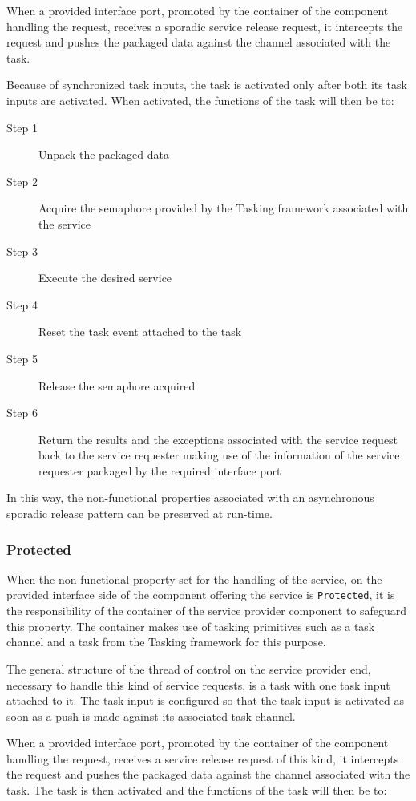 When a provided interface port, promoted by the container of the component handling the request, receives a sporadic service release request, it intercepts the request and pushes the packaged data against the channel associated with the task. 

Because of synchronized task inputs, the task is activated only after both its task inputs are activated. When activated, the functions of the task will then be to:
 
\begin{description}
\item [Step 1] Unpack the packaged data
\item [Step 2] Acquire the semaphore provided by the Tasking framework associated with the service
\item [Step 3] Execute the desired service
\item [Step 4] Reset the task event attached to the task
\item [Step 5] Release the semaphore acquired 
\item [Step 6] Return the results and the exceptions associated with the service request back to the service requester making use of the information of the service requester packaged by the required interface port 
\end{description}

In this way, the non-functional properties associated with an asynchronous sporadic release pattern can be preserved at run-time.

\subsubsection{\textbf{Protected}}
When the non-functional property set for the handling of the service, on the provided interface side of the component offering the service is \texttt{Protected}, it is the responsibility of the container of the service provider component to safeguard this property. The container makes use of tasking primitives such as a task channel and a task from the Tasking framework for this purpose. 

The general structure of the thread of control on the service provider end, necessary to handle this kind of service requests, is a task with one task input attached to it. The task input is configured so that the task input is activated as soon as a push is made against its associated task channel.  

When a provided interface port, promoted by the container of the component handling the request, receives a service release request of this kind, it intercepts the request and pushes the packaged data against the channel associated with the task. The task is then activated and the functions of the task will then be to:

